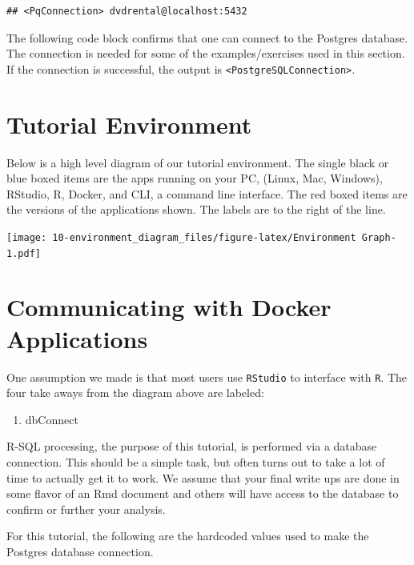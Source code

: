 \documentclass[]{book}
\providecommand{\tightlist}{%
  \setlength{\itemsep}{0pt}\setlength{\parskip}{0pt}}
\theoremstyle{definition}
\theoremstyle{definition}
\theoremstyle{definition}
\theoremstyle{remark}
\begin{document}
\begin{verbatim}
## <PqConnection> dvdrental@localhost:5432
\end{verbatim}

The following code block confirms that one can connect to the Postgres
database. The connection is needed for some of the examples/exercises
used in this section. If the connection is successful, the output is
\texttt{\textless{}PostgreSQLConnection\textgreater{}}.

\hypertarget{tutorial-environment}{%
\section{Tutorial Environment}\label{tutorial-environment}}

Below is a high level diagram of our tutorial environment. The single
black or blue boxed items are the apps running on your PC, (Linux, Mac,
Windows), RStudio, R, Docker, and CLI, a command line interface. The red
boxed items are the versions of the applications shown. The labels are
to the right of the line.

\texttt{[image: 10-environment\_diagram\_files/figure-latex/Environment Graph-1.pdf]}

\hypertarget{communicating-with-docker-applications}{%
\section{Communicating with Docker
Applications}\label{communicating-with-docker-applications}}

One assumption we made is that most users use \texttt{RStudio} to
interface with \texttt{R}. The four take aways from the diagram above
are labeled:

\begin{enumerate}
\def\labelenumi{\arabic{enumi}.}
\tightlist
\item
  dbConnect
\end{enumerate}

R-SQL processing, the purpose of this tutorial, is performed via a
database connection. This should be a simple task, but often turns out
to take a lot of time to actually get it to work. We assume that your
final write ups are done in some flavor of an Rmd document and others
will have access to the database to confirm or further your analysis.

For this tutorial, the following are the hardcoded values used to make
the Postgres database connection.
\end{document}
